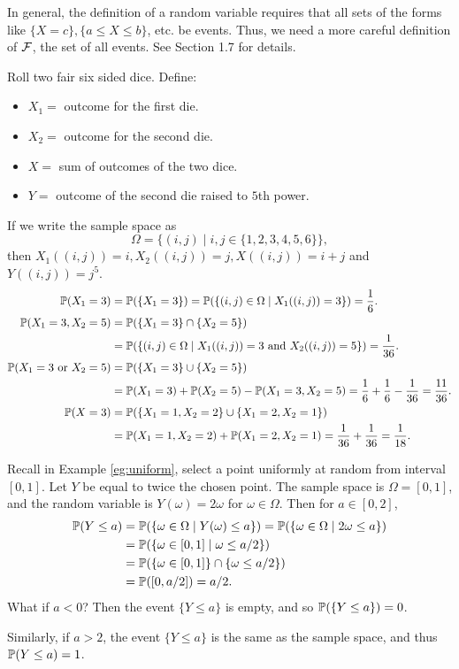   \begin{remark}
    In general, the definition of a random variable requires that all sets of
    the forms like $\{X = c\}, \{a\le X\le b\}$, etc. be events. Thus, we need a
    more careful definition of $\mathcal{F}$, the set of all events. See Section 1.7 for details.
  \end{remark}
  \begin{example}
    \label{eg:two-dice}
    Roll two fair six sided dice. Define:
    \begin{itemize}
    \item $X_1 =$ outcome for the first die.
    \item $X_2 =$ outcome for the second die.
    \item $X = $ sum of outcomes of the two dice.
    \item $Y =$ outcome of the second die raised to $5$th power.
    \end{itemize}
  \end{example}
  If we write the sample space as
  \[
    \Omega = \{(i,j) \mid i,j\in\{1,2,3,4,5,6\}\},
  \]
  then $X_1((i,j)) = i, X_2((i,j)) = j, X((i,j)) = i+j$ and $Y((i,j)) = j^5$.
  \begin{align*}
    \mathbb{P}(X_1 = 3) &  = \mathbb{P}(\{X_1=3\}) = \mathbb{P}(\{(i,j)\in\Omega \mid X_1((i,j)) =3\})=\frac{1}{6}.\\
    \mathbb{P}(X_1=3, X_2  = 5) & = \mathbb{P}(\{X_1 =3\}\cap\{X_2=5\}) \\
    & = \mathbb{P}(\{(i,j)\in\Omega\mid X_1((i,j))=3 ~\text{and}~ X_2((i,j))=5  \}) =\frac{1}{36}.\\
    \mathbb{P}(X_1=3~\text{or}~X_2 = 5) & = \mathbb{P}(\{X_1=3\}\cup\{X_2=5\})\\
                 & = \mathbb{P}(X_1=3) + \mathbb{P}(X_2 = 5) - \mathbb{P}(X_1=3,X_2=5) = \frac{1}{6}+\frac{1}{6}-\frac{1}{36} = \frac{11}{36}.\\
    \mathbb{P}(X = 3) &= \mathbb{P}(\{X_1=1,X_2=2\}\cup\{X_1=2,X_2=1\})\\
                 & =\mathbb{P}(X_1=1,X_2 = 2) + \mathbb{P}(X_1=2,X_2=1)= \frac{1}{36}+\frac{1}{36} = \frac{1}{18}.
  \end{align*}
  \begin{example}
    \label{eg:uniform2}
    Recall in Example \ref{eg:uniform}, select a point uniformly at random from
    interval $[0,1]$. Let $Y$ be equal to twice the chosen point. The sample
    space is $\Omega = [0,1]$, and the random variable is $Y(\omega) = 2\omega$
    for $\omega\in \Omega$. Then for $a\in [0,2]$,
    \begin{align*}
      \mathbb{P}(Y\le a)  & = \mathbb{P}(\{\omega \in \Omega\mid Y(\omega)\le a\}) = \mathbb{P}(\{\omega\in\Omega\mid 2\omega\le a\})\\
                   & = \mathbb{P}(\{\omega\in [0,1]\mid \omega\le a/2\})\\
                   & = \mathbb{P}(\{\omega\in[0,1]\}\cap \{\omega\le a/2\})\\
      & = \mathbb{P}([0,a/2]) = a/2.
    \end{align*}
    What if $a<0$? Then the event $\{Y\le a\}$ is empty, and so $\mathbb{P}(\{Y\le a\})
    = 0$.

    Similarly, if $a>2$, the event $\{Y\le a\}$ is the same as the sample space,
    and thus $\mathbb{P}(Y\le a) = 1$.
  \end{example}
